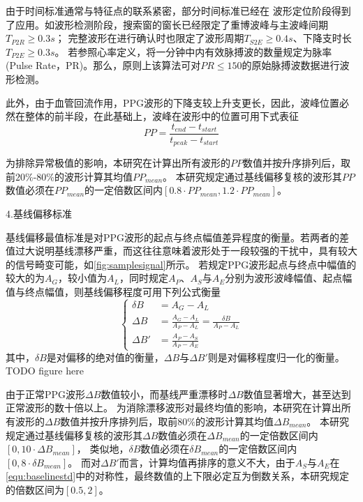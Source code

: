 由于时间标准通常与特征点的联系紧密，部分时间标准已经在
波形定位阶段得到了应用。如波形检测阶段，搜索窗的窗长已经限定了重博波峰与主波峰间期$T_{P2R}\ge0.3s$；
完整波形在进行确认时也限定了波形周期$T_{S2E}\ge 0.4s$、下降支时长$T_{P2E}\ge 0.3s$。
若参照心率定义，将一分钟中内有效脉搏波的数量规定为脉率(Pulse Rate，PR)。那么，原则上该算法可对$PR \le 150$的原始脉搏波数据进行波形检测。

此外，由于血管回流作用，PPG波形的下降支较上升支更长，因此，波峰位置必然在整体的前半段，在此基础上，波峰在波形中的位置可用下式表征
\begin{equation}
    \label{equ:timestd}
    PP = \frac{t_{end}-t_{start}}{t_{peak}-t_{start}}
\end{equation}

为排除异常极值的影响，本研究在计算出所有波形的$PP$数值并按升序排列后，取前$20\%$-$80\%$的波形计算其均值${PP}_{mean}$。
本研究规定通过基线偏移复核的波形其$PP$数值必须在${PP}_{mean}$的一定倍数区间内$[0.8 \cdot {PP}_{mean},1.2 \cdot {PP}_{mean}]$。

4.基线偏移标准

基线偏移最值标准是对PPG波形的起点与终点幅值差异程度的衡量。若两者的差值过大说明基线漂移严重，而这往往意味着波形处于一段较强的干扰中，具有较大的信号畸变可能，如\autoref{fig:samplesignal}所示。
若规定PPG波形起点与终点中幅值的较大的为$A_G$，较小值为$A_L$，同时规定$A_P$、$A_S$与$A_E$分别为波形波峰幅值、起点幅值与终点幅值，则基线偏移程度可用下列公式衡量
\begin{equation}
    \label{equ:baselinestd}
    \left \{
    \begin{aligned}
        \delta B &=A_G-A_L \\
        \Delta B &=\frac{A_G-A_L}{A_P-A_L}=\frac{\delta B}{A_P-A_L}\\
        \Delta B' &=\frac{A_P-A_S}{A_P-A_E}
    \end{aligned}
    \right.
\end{equation}
其中，$\delta B$是对偏移的绝对值的衡量，$\Delta B$与$\Delta B'$则是对偏移程度归一化的衡量。
TODO figure here

由于正常PPG波形$\Delta B$数值较小，而基线严重漂移时$\Delta B$数值显著增大，甚至达到正常波形的数十倍以上。
为消除漂移波形对最终均值的影响，本研究在计算出所有波形的$\Delta B$数值并按升序排列后，取前$80\%$的波形计算其均值${\Delta B}_{mean}$。
本研究规定通过基线偏移复核的波形其$\Delta B$数值必须在${\Delta B}_{mean}$的一定倍数区间内$[0,10 \cdot {\Delta B}_{mean}]$，
类似地，$\delta B$数值必须在${\delta B}_{mean}$的一定倍数区间内$[0,8 \cdot {\delta B}_{mean}]$。
而对$\Delta B'$而言，计算均值再排序的意义不大，由于$A_S$与$A_E$在\autoref{equ:baselinestd}中的对称性，最终数值的上下限必定互为倒数关系，本研究规定的倍数区间为$[0.5,2]$。

